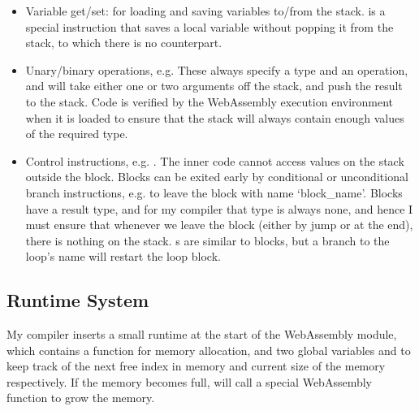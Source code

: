 \begin{itemize}
\item Variable get/set:  for loading and saving variables to/from the stack.  is a special instruction that saves a local variable without popping it from the stack, to which there is no  counterpart.
\item Unary/binary operations, e.g.  These always specify a type and an operation, and will take either one or two arguments off the stack, and push the result to the stack. Code is verified by the WebAssembly execution environment when it is loaded to ensure that the stack will always contain enough values of the required type.
\item Control instructions, e.g. . The inner code cannot access values on the stack outside the block. Blocks can be exited early by conditional or unconditional branch instructions, e.g.  to leave the block with name `block\_name'. Blocks have a result type, and for my compiler that type is always none, and hence I must ensure that whenever we leave the block (either by jump or at the end), there is nothing on the stack. s are similar to blocks, but a branch to the loop's name will restart the loop block.
\end{itemize}

\subsection{Runtime System}
My compiler inserts a small runtime at the start of the WebAssembly module, which contains a function  for memory allocation, and two global variables  and  to keep track of the next free index in memory and current size of the memory respectively. If the memory becomes full,  will call a special WebAssembly function  to grow the memory.

